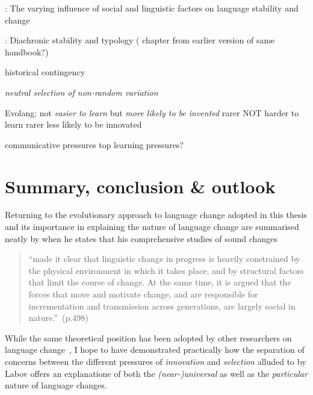 
\citet{Sundgren2009}: The varying influence of social and linguistic factors on language stability and change

\citet{Wichmann2015}: Diachronic stability and typology (\citet{Nichols2003} chapter from earlier version of same handbook?)

historical contingency~\citep[p.503]{Labov2001} %

\emph{neutral selection of non-random variation}

\citep[p.627]{Chater2010evolution}
Evolang: not \emph{easier to learn} but \emph{more likely to be invented}
rarer NOT harder to learn
rarer less likely to be innovated

communicative pressures top learning pressures?





\section{Summary, conclusion \& outlook}\label{sec:conclusion}

Returning to the evolutionary approach to language change adopted in this thesis and its importance in explaining the nature of language change are summarised neatly by \citet{Labov2001} when he states that his comprehensive studies of sound changes
\begin{quote}
``made it clear that linguistic change in progress is heavily constrained by the physical environment in which it takes place, and by structural factors that limit the course of change. At the same time, it is argued that the forces that move and motivate change, and are responsible for incrementation and transmission across generations, are largely social in nature.''~(p.498)
\end{quote}

While the same theoretical position has been adopted by other researchers on language change~\citep[particularly][]{Croft2000}, I hope to have demonstrated practically how the separation of concerns between the different pressures of \emph{innovation} and \emph{selection} alluded to by Labov offers an explanatione of both the \emph{(near-)universal} as well as the \emph{particular} nature of language changes.


